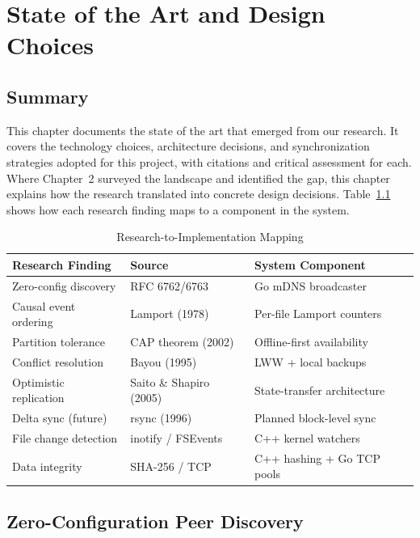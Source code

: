 \chapter{State of the Art and Design Choices}

\section{Summary}
\label{sec:state-of-art-summary}

This chapter documents the state of the art that emerged from our research. It covers the technology choices, architecture decisions, and synchronization strategies adopted for this project, with citations and critical assessment for each. Where Chapter~2 surveyed the landscape and identified the gap, this chapter explains how the research translated into concrete design decisions. Table~\ref{tab:research-mapping} shows how each research finding maps to a component in the system.

\begin{table}[htbp]
\centering
\caption{Research-to-Implementation Mapping}
\label{tab:research-mapping}
\begin{tabular}{p{4.5cm} p{4cm} p{5cm}}
\toprule
\textbf{Research Finding} & \textbf{Source} & \textbf{System Component} \\
\midrule
Zero-config discovery & RFC 6762/6763 & Go mDNS broadcaster \\
\midrule
Causal event ordering & Lamport (1978) & Per-file Lamport counters \\
\midrule
Partition tolerance & CAP theorem (2002) & Offline-first availability \\
\midrule
Conflict resolution & Bayou (1995) & LWW + local backups \\
\midrule
Optimistic replication & Saito \& Shapiro (2005) & State-transfer architecture \\
\midrule
Delta sync (future) & rsync (1996) & Planned block-level sync \\
\midrule
File change detection & inotify / FSEvents & C++ kernel watchers \\
\midrule
Data integrity & SHA-256 / TCP & C++ hashing + Go TCP pools \\
\bottomrule
\end{tabular}
\end{table}

\section{Zero-Configuration Peer Discovery}

